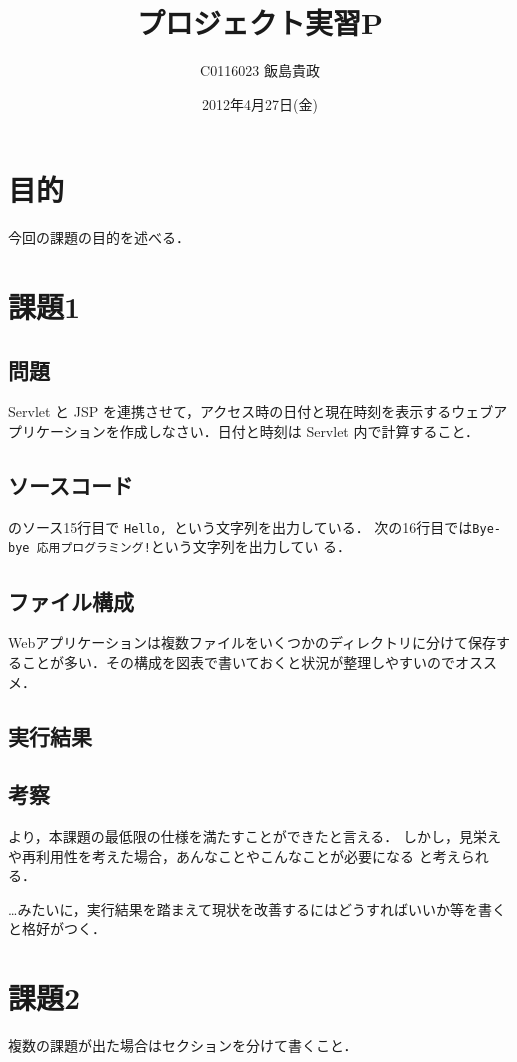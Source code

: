 \documentclass[a4j,10pt]{jsarticle}
\title{プロジェクト実習P}
\author{C0116023 飯島貴政}
\date{2012年4月27日(金)}
\begin{document}
\maketitle


\section{目的}

今回の課題の目的を述べる．


\section{課題1}

\subsection{問題}

Servlet と JSP を連携させて，アクセス時の日付と現在時刻を表示するウェブア
プリケーションを作成しなさい．日付と時刻は Servlet 内で計算すること．


\subsection{ソースコード}



のソース15行目で {\tt Hello, }という文字列を出力している．
次の16行目では{\tt Bye-bye 応用プログラミング!}という文字列を出力してい
る．

\subsection{ファイル構成}


Webアプリケーションは複数ファイルをいくつかのディレクトリに分けて保存す
ることが多い．その構成を図表で書いておくと状況が整理しやすいのでオススメ．


\subsection{実行結果}


\subsection{考察}

 より，本課題の最低限の仕様を満たすことができたと言える．
しかし，見栄えや再利用性を考えた場合，あんなことやこんなことが必要になる
と考えられる．

…みたいに，実行結果を踏まえて現状を改善するにはどうすればいいか等を書く
と格好がつく．

\section{課題2}

複数の課題が出た場合はセクションを分けて書くこと．
\end{document}
